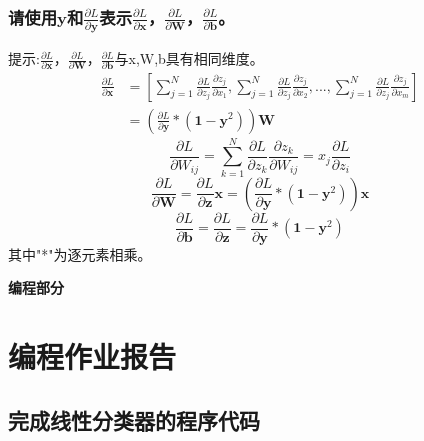 \documentclass[a4paper]{article}
\begin{document}
\subsubsection{请使用$\mathbf{y}$和$\frac{\partial L}{\partial \mathbf{y}}$表示$\frac{\partial L}{\partial \mathbf{x}}$，$\frac{\partial L}{\partial \mathbf{W}}$，$\frac{\partial L}{\partial \mathbf{b}}$。}
提示:$\frac{\partial L}{\partial \mathbf{x}}$，$\frac{\partial L}{\partial \mathbf{W}}$，$\frac{\partial L}{\partial \mathbf{b}}$与x,W,b具有相同维度。
\begin{equation}
\begin{aligned}
    \frac{\partial L}{\partial \mathbf{x}} &= \left[\sum_{j=1}^N \frac{\partial L}{\partial z_j} \frac{\partial z_j}{\partial x_1}, \sum_{j=1}^N \frac{\partial L}{\partial z_j} \frac{\partial z_j}{\partial x_2}, ..., \sum_{j=1}^N \frac{\partial L}{\partial z_j} \frac{\partial z_j}{\partial x_m}\right] \\
    &= \left(\frac{\partial L}{\partial \mathbf{y}} * (\mathbf{1} - \mathbf{y}^2)\right) \mathbf{W}
\end{aligned}
\end{equation}
\begin{equation}
    \frac{\partial L}{\partial W_{ij}} = \sum_{k=1}^N \frac{\partial L}{\partial z_k} \frac{\partial z_k}{\partial W_{ij}} = x_j \frac{\partial L}{\partial z_i}
\end{equation}
\begin{equation}
    \frac{\partial L}{\partial \mathbf{W}} = \frac{\partial L}{\partial \mathbf{z}} \mathbf{x} = \left(\frac{\partial L}{\partial \mathbf{y}} * (\mathbf{1} - \mathbf{y}^2)\right) \mathbf{x}
\end{equation}
\begin{equation}
    \frac{\partial L}{\partial \mathbf{b}} = \frac{\partial L}{\partial \mathbf{z}} = \frac{\partial L}{\partial \mathbf{y}} * (\mathbf{1} - \mathbf{y}^2)
\end{equation}
其中"*"为逐元素相乘。

\vspace{6mm}
\centerline{\textbf{\Large{编程部分}}}
\vspace{3mm}
\section{编程作业报告}
\subsection{完成线性分类器的程序代码}
\end{document}
